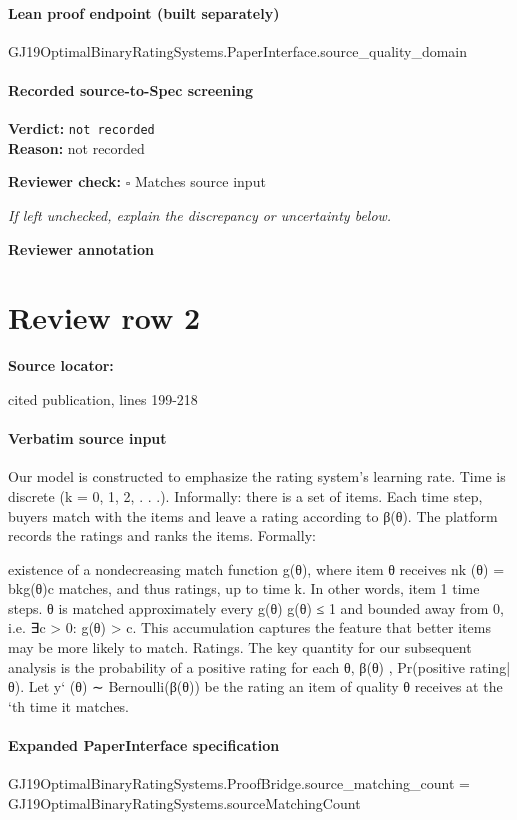 \documentclass[10pt]{article}
\newcommand{\reviewerbox}{%
  \par\noindent\fbox{\parbox{0.96\linewidth}{\rule{0pt}{0.38in}}}\par
}
\newcommand{\reviewmatch}[1]{%
  \par\noindent\textbf{Reviewer check:} $\square$\; #1\par
  \noindent\emph{If left unchecked, explain the discrepancy or uncertainty below.}\par
}
\begin{document}
\paragraph{Lean proof endpoint (built separately)}\begin{ReviewVerbatim}
GJ19OptimalBinaryRatingSystems.PaperInterface.source_quality_domain
\end{ReviewVerbatim}

\paragraph{Recorded source-to-Spec screening}
\textbf{Verdict:} \texttt{not recorded}
\\
\textbf{Reason:} not recorded
\reviewmatch{Matches source input}
\noindent\textbf{Reviewer annotation}\par
\reviewerbox
\clearpage
\hypertarget{source-claim-7979c322a62ef2c2}{}
\section*{Review row 2}
\textbf{Source locator:} {\footnotesize\raggedright cited publication, lines 199-\allowbreak{}218\par}
\paragraph{Verbatim source input}
\begin{ReviewVerbatim}
Our model is constructed to emphasize the rating system’s learning rate. Time is discrete (k =
0, 1, 2, . . .). Informally: there is a set of items. Each
time step, buyers match with the items and leave a
rating according to β(θ). The platform records the
ratings and ranks the items. Formally:

existence of a nondecreasing match function g(θ),
where item θ receives nk (θ) = bkg(θ)c matches, and
thus ratings, up to time k. In other words, item
1
time steps.
θ is matched approximately every g(θ)
g(θ) ≤ 1 and bounded away from 0, i.e. ∃c > 0:
g(θ) > c. This accumulation captures the feature
that better items may be more likely to match.
Ratings. The key quantity for our subsequent
analysis is the probability of a positive rating for
each θ, β(θ) , Pr(positive rating|θ). Let y` (θ) ∼
Bernoulli(β(θ)) be the rating an item of quality θ
receives at the `th time it matches.
\end{ReviewVerbatim}


\paragraph{Expanded PaperInterface specification}
\begin{ReviewVerbatim}
GJ19OptimalBinaryRatingSystems.ProofBridge.source_matching_count = GJ19OptimalBinaryRatingSystems.sourceMatchingCount
\end{ReviewVerbatim}
\end{document}
